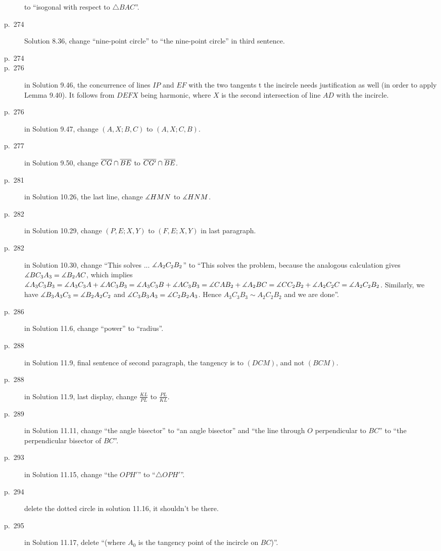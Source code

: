 \documentclass[11pt]{scrartcl}
\begin{document}
\begin{description}
  to ``isogonal with respect to $\triangle{BAC}$''.
\item[p.\  274] Solution 8.36, change ``nine-point circle''
  to ``the nine-point circle'' in third sentence.
\item[p.\  274] 
\item[p.\  276] in Solution 9.46, the concurrence of lines $IP$ and $EF$
  with the two tangents t the incircle needs justification as well
  (in order to apply Lemma 9.40). It follows from $DEFX$ being harmonic,
  where $X$ is the second intersection of line $AD$ with the incircle.
\item[p.\  276] in Solution 9.47, change $(A,X;B,C)$ to $(A,X;C,B)$.
\item[p.\  277] in Solution 9.50, change $\overline{CG} \cap \overline{BE}$ to $\overline{CG'} \cap \overline{BE}$.
\item[p.\  281] in Solution 10.26, the last line, change $\measuredangle HMN$ to $\measuredangle HNM$.
\item[p.\  282] in Solution 10.29, change $(P,E;X,Y)$ to $(F,E;X,Y)$ in last paragraph.
\item[p.\  282] in Solution 10.30, change ``This solves ... $\measuredangle A_2C_2B_2$'' to
  ``This solves the problem, because the analogous calculation gives $\measuredangle BC_3A_3 = \measuredangle B_2AC$,
  which implies $\measuredangle A_3C_3B_3 = \measuredangle A_3C_3A + \measuredangle AC_3B_3 = \measuredangle A_3C_3B + \measuredangle AC_3B_3
  = \measuredangle CAB_2 + \measuredangle A_2BC = \measuredangle CC_2B_2 + \measuredangle A_2C_2C = \measuredangle A_2C_2B_2$.
  Similarly, we have $\measuredangle B_3A_3C_3 = \measuredangle B_2A_2C_2$ and $\measuredangle C_3B_3A_3 = \measuredangle C_2B_2A_3$.
  Hence $A_3C_3B_3 \sim A_2C_2B_2$ and we are done''.
\item[p.\  286] in Solution 11.6, change ``power'' to ``radius''.
\item[p.\  288] in Solution 11.9, final sentence of second paragraph,
  the tangency is to $(DCM)$, and not $(BCM)$.
\item[p.\  288] in Solution 11.9, last display, change $\frac{KL}{PL}$ to $\frac{PL}{KL}$.
\item[p.\  289] in Solution 11.11, change ``the angle bisector'' to ``an angle bisector''
  and ``the line through $O$ perpendicular to $BC$'' to ``the perpendicular bisector of $BC$''.
\item[p.\  293] in Solution 11.15, change ``the $OPH'$'' to ``$\triangle{OPH'}$''.
\item[p.\  294] delete the dotted circle in solution 11.16, it shouldn't be there.
\item[p.\  295] in Solution 11.17, delete ``(where $A_0$ is the tangency point of the incircle on $BC$)''.

\end{description}
\end{document}
